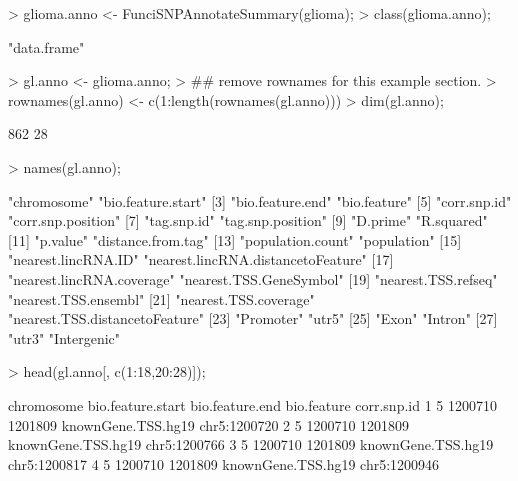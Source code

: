 \documentclass[12pt,fullpage]{article}
\begin{document}
\begin{Schunk}
\begin{Sinput}
> glioma.anno <- FunciSNPAnnotateSummary(glioma);
> class(glioma.anno);
\end{Sinput}
\begin{Soutput}
[1] "data.frame"
\end{Soutput}
\begin{Sinput}
> gl.anno <- glioma.anno;
> ## remove rownames for this example section.
> rownames(gl.anno) <- c(1:length(rownames(gl.anno)))
> dim(gl.anno);
\end{Sinput}
\begin{Soutput}
[1] 862  28
\end{Soutput}
\begin{Sinput}
> names(gl.anno);
\end{Sinput}
\begin{Soutput}
 [1] "chromosome"                        "bio.feature.start"                
 [3] "bio.feature.end"                   "bio.feature"                      
 [5] "corr.snp.id"                       "corr.snp.position"                
 [7] "tag.snp.id"                        "tag.snp.position"                 
 [9] "D.prime"                           "R.squared"                        
[11] "p.value"                           "distance.from.tag"                
[13] "population.count"                  "population"                       
[15] "nearest.lincRNA.ID"                "nearest.lincRNA.distancetoFeature"
[17] "nearest.lincRNA.coverage"          "nearest.TSS.GeneSymbol"           
[19] "nearest.TSS.refseq"                "nearest.TSS.ensembl"              
[21] "nearest.TSS.coverage"              "nearest.TSS.distancetoFeature"    
[23] "Promoter"                          "utr5"                             
[25] "Exon"                              "Intron"                           
[27] "utr3"                              "Intergenic"                       
\end{Soutput}
\begin{Sinput}
> head(gl.anno[, c(1:18,20:28)]);
\end{Sinput}
\begin{Soutput}
  chromosome bio.feature.start bio.feature.end        bio.feature  corr.snp.id
1          5           1200710         1201809 knownGene.TSS.hg19 chr5:1200720
2          5           1200710         1201809 knownGene.TSS.hg19 chr5:1200766
3          5           1200710         1201809 knownGene.TSS.hg19 chr5:1200817
4          5           1200710         1201809 knownGene.TSS.hg19 chr5:1200946

\end{Soutput}
\end{Schunk}
\end{document}
